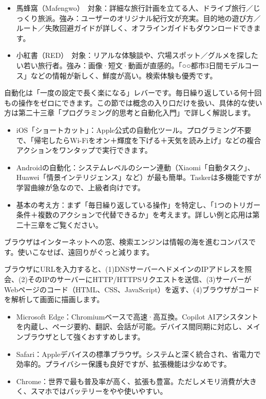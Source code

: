 
\begin{itemize}
  \item 馬蜂窩（Mafengwo）　対象：詳細な旅行計画を立てる人、ドライブ旅行／じっくり旅派。強み：ユーザーのオリジナル紀行文が充実。目的地の遊び方／ルート／失敗回避ガイドが詳しく、オフラインガイドもダウンロードできます。
  \item 小紅書（RED）　対象：リアルな体験談や、穴場スポット／グルメを探したい若い旅行者。強み：画像·短文·動画が直感的。「○○都市3日間モデルコース」などの情報が新しく、鮮度が高い。検索体験も優秀です。
\end{itemize}


自動化は「一度の設定で長く楽になる」レバーです。毎日繰り返している何十回もの操作をゼロにできます。この節では概念の入り口だけを扱い、具体的な使い方は第二十三章「プログラミング的思考と自動化入門」で詳しく解説します。

\begin{itemize}
  \item iOS「ショートカット」：Apple公式の自動化ツール。プログラミング不要で、「帰宅したらWi-Fiをオン＋輝度を下げる＋天気を読み上げ」などの複合アクションをワンタップで実行できます。
  \item Androidの自動化：システムレベルのシーン連動（Xiaomi「自動タスク」、Huawei「情景インテリジェンス」など）が最も簡単。Taskerは多機能ですが学習曲線が急なので、上級者向けです。
  \item 基本の考え方：まず「毎日繰り返している操作」を特定し、「1つのトリガー条件＋複数のアクションで代替できるか」を考えます。詳しい例と応用は第二十三章をご覧ください。
\end{itemize}


ブラウザはインターネットへの窓、検索エンジンは情報の海を進むコンパスです。使いこなせば、遠回りがぐっと減ります。


ブラウザにURLを入力すると、(1)DNSサーバーへドメインのIPアドレスを照会、(2)そのIPのサーバーにHTTP/HTTPSリクエストを送信、(3)サーバーがWebページのコード（HTML、CSS、JavaScript）を返す、(4)ブラウザがコードを解析して画面に描画します。


\begin{itemize}
  \item Microsoft Edge：Chromiumベースで高速·高互換。Copilot AIアシスタントを内蔵し、ページ要約、翻訳、会話が可能。デバイス間同期に対応し、メインブラウザとして強くおすすめします。
  \item Safari：Appleデバイスの標準ブラウザ。システムと深く統合され、省電力で効率的。プライバシー保護も良好ですが、拡張機能は少なめです。
  \item Chrome：世界で最も普及率が高く、拡張も豊富。ただしメモリ消費が大きく、スマホではバッテリーをやや使いやすい。
\end{itemize}

